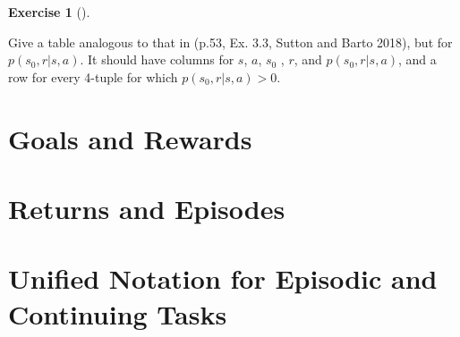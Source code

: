 \documentclass[
  letterpaper,
  DIV=11,
  numbers=noendperiod]{scrreprt}
\theoremstyle{definition}
\newtheorem{exercise}{Exercise}[chapter]
\theoremstyle{remark}
\begin{document}
\begin{figure}


\caption{\label{fig-robot-diagram}}

\end{figure}%

\begin{exercise}[]\protect\hypertarget{exr-001}{}\label{exr-001}

Give a table analogous to that in (p.53, Ex. 3.3, Sutton and Barto
2018), but for \(p(s_0 , r |s, a)\). It should have columns for \(s\),
\(a\), \(s_0\) , \(r\), and \(p(s_0 , r |s, a)\), and a row for every
4-tuple for which \(p(s_0 , r |s, a) > 0\).

\end{exercise}

\section{Goals and Rewards}\label{goals-and-rewards}

\section{Returns and Episodes}\label{returns-and-episodes}

\section{Unified Notation for Episodic and Continuing
Tasks}\label{unified-notation-for-episodic-and-continuing-tasks}
\end{document}
